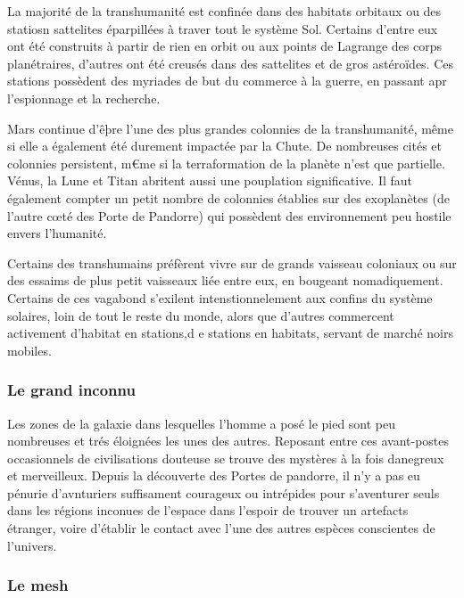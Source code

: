 La majorité de la transhumanité est confinée dans des habitats orbitaux ou des statiosn sattelites éparpillées à traver tout le système Sol. Certains d'entre eux ont été construits à partir de rien en orbit ou aux points de Lagrange des corps planétraires, d'autres ont été creusés dans des sattelites et de gros astéroïdes. Ces stations possèdent des myriades de but du commerce à la guerre, en passant apr l'espionnage et la recherche. 

Mars continue d'êþre l'une des plus grandes colonnies de la transhumanité, même si elle a également été durement impactée par la Chute. De nombreuses cités et colonnies persistent, m€me si la terraformation de la planète n'est que partielle. Vénus, la Lune et Titan abritent aussi une pouplation significative. Il faut également compter un petit nombre de colonnies établies sur des exoplanètes (de l'autre cœté des Porte de Pandorre) qui possèdent des environnement peu hostile envers l'humanité. 

Certains des transhumains préfèrent vivre sur de grands vaisseau coloniaux ou sur des essaims de plus petit vaisseaux liée entre eux, en bougeant nomadiquement. Certains de ces vagabond s'exilent intenstionnelement aux confins du système solaires, loin de tout le reste du monde, alors que d'autres commercent activement d'habitat en stations,d e stations en habitats, servant de marché noirs mobiles. 



\subsubsection{Le grand inconnu} \label{sec:great-unknown} 

Les zones de la galaxie dans lesquelles l'homme a posé le pied sont peu nombreuses et trés éloignées les unes des autres. Reposant entre ces avant-postes occasionnels de civilisations douteuse se trouve des mystères à la fois danegreux et merveilleux. Depuis la découverte des Portes de pandorre, il n'y a pas eu pénurie d'avnturiers suffisament courageux ou intrépides pour s'aventurer seuls dans les régions inconues de l'espace dans l'espoir de trouver un artefacts étranger, voire d'établir le contact avec l'une des autres espèces conscientes de l'univers. 



\subsubsection{Le mesh} \label{sec:mesh} 

